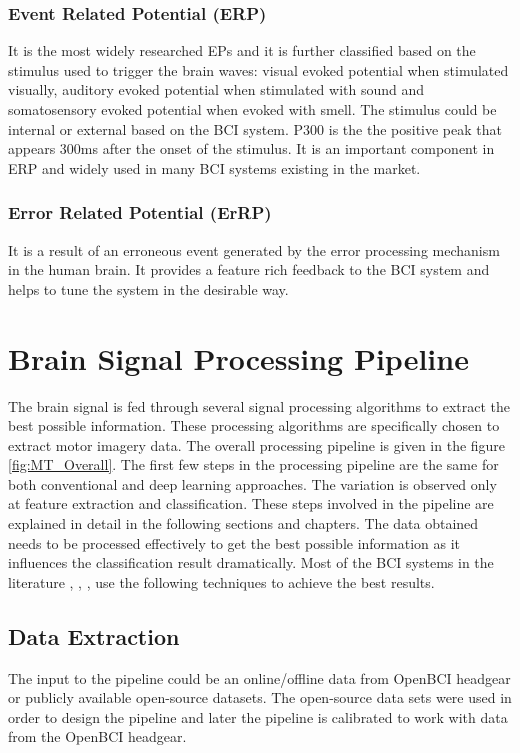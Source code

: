 \subsubsection{Event Related Potential (ERP)}
It is the most widely researched EPs and it is further classified based on the stimulus used to trigger the brain waves: visual evoked potential when stimulated visually, auditory evoked potential when stimulated with sound and somatosensory evoked potential when evoked with smell. The stimulus could be internal or external based on the BCI system. P300 is the the positive peak that appears 300ms after the onset of the stimulus. It is an important component in ERP and widely used in many BCI systems existing in the market.

\subsubsection{Error Related Potential (ErRP)}
It is a result of an erroneous event generated by the error processing mechanism in the human brain. It provides a feature rich feedback to the BCI system and helps to tune the system in the desirable way.

\section{Brain Signal Processing Pipeline}
The brain signal is fed through several signal processing algorithms to extract the best possible information. These processing algorithms are specifically chosen to extract motor imagery data. The overall processing pipeline is given in the figure \ref{fig:MT_Overall}. The first few steps in the processing pipeline are the same for both conventional and deep learning approaches. The variation is observed only at feature extraction and classification. These steps involved in the pipeline are explained in detail in the following sections and chapters. The data obtained needs to be processed effectively to get the best possible information as it influences the classification result dramatically. Most of the BCI systems in the literature \cite{2020_Survey_DL_BCI}, \cite{2022_MI_DL_Old_Survey}, \cite{2022_MI_classification}, \cite{2022_EEG_MI_Survey} use the following techniques to achieve the best results. 

\subsection{Data Extraction}
The input to the pipeline could be an online/offline data from OpenBCI headgear or publicly available open-source datasets. The open-source data sets were used in order to design the pipeline and later the pipeline is calibrated to work with data from the OpenBCI headgear.

